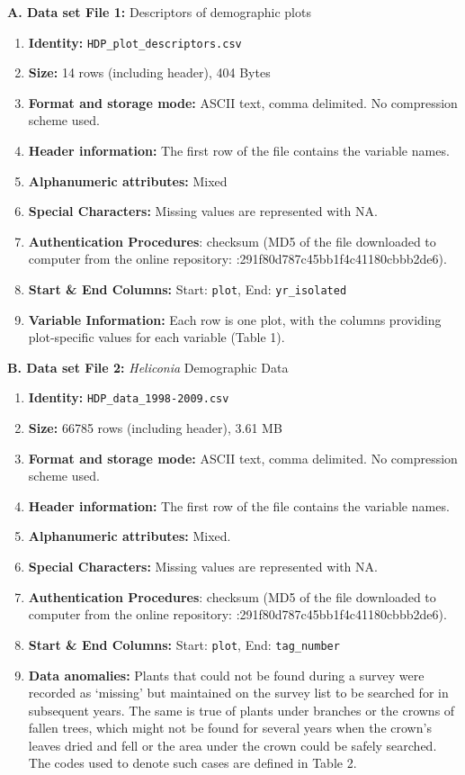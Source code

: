 \documentclass[
  12pt,
  man, donotrepeattitle,floatsintext]{apa6}
\begin{document}
\noindent  
\textbf{A. Data set File 1:} Descriptors of demographic plots

\begin{enumerate}
\def\labelenumi{\arabic{enumi}.}
\item
  \textbf{Identity:} \texttt{HDP\_plot\_descriptors.csv}
\item
  \textbf{Size:} 14 rows (including header), 404 Bytes
\item
  \textbf{Format and storage mode:} ASCII text, comma delimited. No
  compression scheme used.
\item
  \textbf{Header information:} The first row of the file contains the variable names.
\item
  \textbf{Alphanumeric attributes:} Mixed
\item
  \textbf{Special Characters:} Missing values are represented with NA.
\item
  \textbf{Authentication Procedures}: checksum (MD5 of the file downloaded to computer from the online repository: :291f80d787c45bb1f4c41180cbbb2de6).
\item
  \textbf{Start \& End Columns:} Start: \texttt{plot}, End: \texttt{yr\_isolated}
\item
  \textbf{Variable Information:} Each row is one plot, with the columns providing plot-specific values for each variable (Table 1).
\end{enumerate}

\noindent 
\textbf{B. Data set File 2:} \emph{Heliconia} Demographic Data

\begin{enumerate}
\def\labelenumi{\arabic{enumi}.}
\item
  \textbf{Identity:} \texttt{HDP\_data\_1998-2009.csv}
\item
  \textbf{Size:} 66785 rows (including header), 3.61 MB
\item
  \textbf{Format and storage mode:} ASCII text, comma delimited. No compression scheme used.
\item
  \textbf{Header information:} The first row of the file contains the variable names.
\item
  \textbf{Alphanumeric attributes:} Mixed.
\item
  \textbf{Special Characters:} Missing values are represented with NA.
\item
  \textbf{Authentication Procedures}: checksum (MD5 of the file downloaded to computer from the online repository: :291f80d787c45bb1f4c41180cbbb2de6).
\item
  \textbf{Start \& End Columns:} Start: \texttt{plot}, End: \texttt{tag\_number}
\item
  \textbf{Data anomalies:} Plants that could not be found during a survey were recorded as `missing' but maintained on the survey list to be searched for in subsequent years. The same is true of plants under branches or the crowns of fallen trees, which might not be found for several years when the crown's leaves dried and fell or the area under the crown could be safely searched. The codes used to denote such cases are defined in Table 2.
\end{enumerate}
\end{document}

